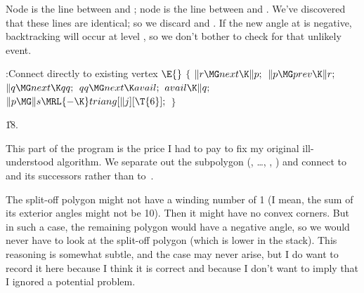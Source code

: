 Node  is the line between  and ; node  is the line between
 and . We've discovered that these lines are identical; so
we discard
 and . If the new angle at  is negative,
backtracking will
occur at level , so we don't bother to check for that unlikely
event.

\Y\B\4:Connect  directly to existing vertex %
\X${}\E{}$\6
${}\{{}$\1\6
${}\|r\MG\\{next}\K\|p;{}$\6
${}\|p\MG\\{prev}\K\|r;{}$\6
${}\|q\MG\\{next}\K\\{qq};{}$\6
${}\\{qq}\MG\\{next}\K\\{avail};{}$\6
${}\\{avail}\K\|q;{}$\6
${}\|p\MG\|s\MRL{-{\K}}\\{triang}[\|j][\T{6}];{}$\6
\4${}\}{}$\2\par
\U18.\fi

This part of the program is the price I had to pay to fix
my original
ill-understood algorithm. We separate out the subpolygon (, \dots,
, ) and connect  to  and its
successors rather than to~.

The split-off polygon might not have a winding number of 1 (I mean, the
sum of its exterior angles  might not be 10). Then it might
have
no convex corners. But in such a case, the remaining polygon would have
a negative angle, so we would never have to look at the split-off polygon
(which is lower in the stack). This reasoning is somewhat subtle, and the
case may never arise, but I do want to record it here because I think it
is correct and because I don't want to imply that I ignored a
potential problem.

